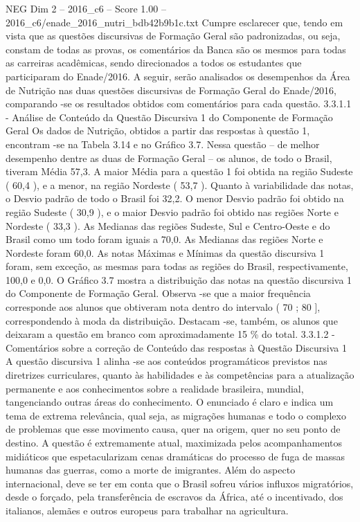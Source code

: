 \begin{textsample}{NEG Dim 2 – 2016\_c6 – Score 1.00 – 2016\_c6/enade\_2016\_nutri\_bdb42b9b1c.txt}
Cumpre esclarecer que, tendo em vista que as questões discursivas de Formação Geral são padronizadas, ou seja, constam de todas as provas, os comentários da Banca são os mesmos para todas as carreiras acadêmicas, sendo direcionados a todos os estudantes que participaram do Enade/2016.
A seguir, serão analisados os desempenhos da Área de Nutrição nas duas questões discursivas de Formação Geral do Enade/2016, comparando -se os resultados obtidos com comentários para cada questão. 3.3.1.1 - Análise de Conteúdo da Questão Discursiva 1 do Componente de Formação Geral Os dados de Nutrição, obtidos a partir das respostas à questão 1, encontram -se na Tabela 3.14 e no Gráfico 3.7.
Nessa questão – de melhor desempenho dentre as duas de Formação Geral – os alunos, de todo o Brasil, tiveram Média 57,3.
A maior Média para a questão 1 foi obtida na região Sudeste ( 60,4 ), e a menor, na região Nordeste ( 53,7 ).
Quanto à variabilidade das notas, o Desvio padrão de todo o Brasil foi 32,2.
O menor Desvio padrão foi obtido na região Sudeste ( 30,9 ), e o maior Desvio padrão foi obtido nas regiões Norte e Nordeste ( 33,3 ).
As Medianas das regiões Sudeste, Sul e Centro-Oeste e do Brasil como um todo foram iguais a 70,0.
As Medianas das regiões Norte e Nordeste foram 60,0.
As notas Máximas e Mínimas da questão discursiva 1 foram, sem exceção, as mesmas para todas as regiões do Brasil, respectivamente, 100,0 e 0,0.
O Gráfico 3.7 mostra a distribuição das notas na questão discursiva 1 do Componente de Formação Geral.
Observa -se que a maior frequência corresponde aos alunos que obtiveram nota dentro do intervalo ( 70 ; 80 ], correspondendo à moda da distribuição.
Destacam -se, também, os alunos que deixaram a questão em branco com aproximadamente 15 \% do total. 3.3.1.2 - Comentários sobre a correção de Conteúdo das respostas à Questão Discursiva 1 A questão discursiva 1 alinha -se aos conteúdos programáticos previstos nas diretrizes curriculares, quanto às habilidades e às competências para a atualização permanente e aos conhecimentos sobre a realidade brasileira, mundial, tangenciando outras áreas do conhecimento.
O enunciado é claro e indica um tema de extrema relevância, qual seja, as migrações humanas e todo o complexo de problemas que esse movimento causa, quer na origem, quer no seu ponto de destino.
A questão é extremamente atual, maximizada pelos acompanhamentos midiáticos que espetacularizam cenas dramáticas do processo de fuga de massas humanas das guerras, como a morte de imigrantes.
Além do aspecto internacional, deve se ter em conta que o Brasil sofreu vários influxos migratórios, desde o forçado, pela transferência de escravos da África, até o incentivado, dos italianos, alemães e outros europeus para trabalhar na agricultura.

\end{textsample}
